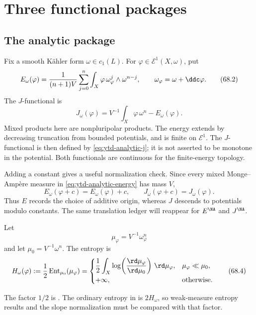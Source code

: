 \section{Three functional packages}
\label{sec:ytd-three-packages}

\subsection{The analytic package}
\label{subsec:ytd-analytic}

Fix a smooth K\"ahler form $\omega\in c_1(L)$. For
$\varphi\in\mathcal E^1(X,\omega)$, put
\[
 E_\omega(\varphi)
 =\frac{1}{(n+1)V}
   \sum_{j=0}^{n}
    \int_X\varphi\,
       \omega_\varphi^j\wedge\omega^{n-j},
\qquad
 \omega_\varphi=\omega+\ddc\varphi.
\tag{68.2}\label{eq:ytd-analytic-energy}
\]
The $J$-functional is
\[
                    J_\omega(\varphi)
       =V^{-1}\int_X\varphi\,\omega^n-E_\omega(\varphi).
\tag{68.3}\label{eq:ytd-analytic-j}
\]
Mixed products here are nonpluripolar products. The energy extends by
decreasing truncation from bounded potentials, and is finite on
$\mathcal E^1$. The $J$-functional is then defined by
\eqref{eq:ytd-analytic-j}; it is not asserted to be monotone in the potential.
Both functionals are continuous for the finite-energy topology.

\begin{remark}
\label{rem:ytd-energy-translation}
Adding a constant gives a useful normalization check. Since every mixed
Monge--Amp\`ere measure in \eqref{eq:ytd-analytic-energy} has mass $V$,
\[
 E_\omega(\varphi+c)=E_\omega(\varphi)+c,
 \qquad
 J_\omega(\varphi+c)=J_\omega(\varphi).
\]
Thus $E$ records the choice of additive origin, whereas $J$ descends to
potentials modulo constants. The same translation ledger will reappear for
$E^{\NA}$ and $J^{\NA}$.
\end{remark}

Let
\[
                         \mu_\varphi=V^{-1}\omega_\varphi^n
\]
and let $\mu_0=V^{-1}\omega^n$. The entropy is
\[
 H_\omega(\varphi)
  :=\frac12\operatorname{Ent}_{\mu_0}(\mu_\varphi)
  =
  \begin{cases}
   \displaystyle
   \frac12\int_X\log\!\left(\frac{\rd\mu_\varphi}{\rd\mu_0}\right)\,\rd\mu_\varphi,
      &\mu_\varphi\ll\mu_0,\\[6pt]
   +\infty,&\text{otherwise}.
  \end{cases}
\tag{68.4}\label{eq:ytd-analytic-entropy}
\]

The factor $1/2$ is \cite[equation~(1.10)]{BHJ19}. The ordinary entropy in
 is $2H_\omega$, so weak-measure entropy
results and the slope normalization must be compared with that factor.

